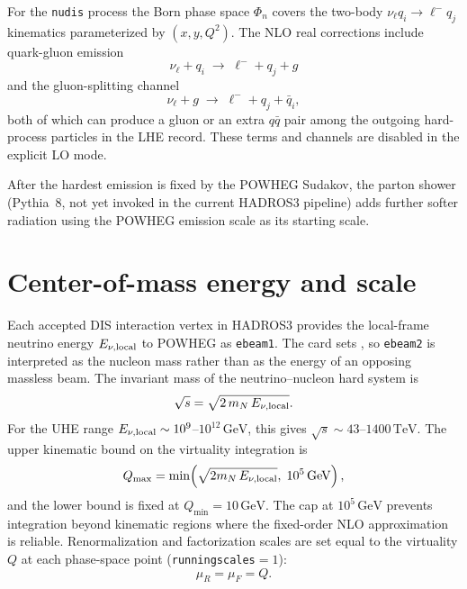 \documentclass[11pt,a4paper]{report}
\numberwithin{equation}{chapter}
\newcommand{\code}[1]{\texttt{\detokenize{#1}}}
\begin{document}
For the \texttt{nudis} process the Born phase space $\Phi_n$ covers the
two-body $\nu_\ell q_i \to \ell^- q_j$ kinematics parameterized by
$(x,y,Q^2)$. The NLO real corrections include quark-gluon emission
\begin{equation}
\nu_\ell + q_i \;\longrightarrow\; \ell^- + q_j + g
\end{equation}
and the gluon-splitting channel
\begin{equation}
\nu_\ell + g \;\longrightarrow\; \ell^- + q_j + \bar{q}_i,
\end{equation}
both of which can produce a gluon or an extra $q\bar{q}$ pair among the
outgoing hard-process particles in the LHE record. These terms and channels are
disabled in the explicit LO mode.

After the hardest emission is fixed by the POWHEG Sudakov, the parton shower
(Pythia~8, not yet invoked in the current HADROS3 pipeline) adds further
softer radiation using the POWHEG emission scale as its starting scale.

\section{Center-of-mass energy and scale}

Each accepted DIS interaction vertex in HADROS3 provides the local-frame
neutrino energy $E_{\nu,\rm local}$ to POWHEG as \texttt{ebeam1}. The
card sets \code{fixed_target=1}, so \texttt{ebeam2} is interpreted as the
nucleon mass rather than as the energy of an opposing massless beam. The
invariant mass of the neutrino--nucleon hard system is
\begin{equation}
\sqrt{s} = \sqrt{2\,m_N\,E_{\nu,\rm local}}.
\end{equation}
For the UHE range $E_{\nu,\rm local}\sim 10^9$--$10^{12}\,\mathrm{GeV}$,
this gives $\sqrt{s}\sim 43$--$1400\,\mathrm{TeV}$. The upper kinematic
bound on the virtuality integration is
\begin{equation}
Q_{\max}
=
\min\!\left(\sqrt{2m_N\,E_{\nu,\rm local}},\;10^5\,\mathrm{GeV}\right),
\end{equation}
and the lower bound is fixed at $Q_{\min}=10\,\mathrm{GeV}$. The cap at
$10^5\,\mathrm{GeV}$ prevents integration beyond kinematic regions where the
fixed-order NLO approximation is reliable. Renormalization and factorization
scales are set equal to the virtuality $Q$ at each phase-space point
(\texttt{runningscales}$=1$):
\begin{equation}
\mu_R = \mu_F = Q.
\end{equation}
\end{document}
